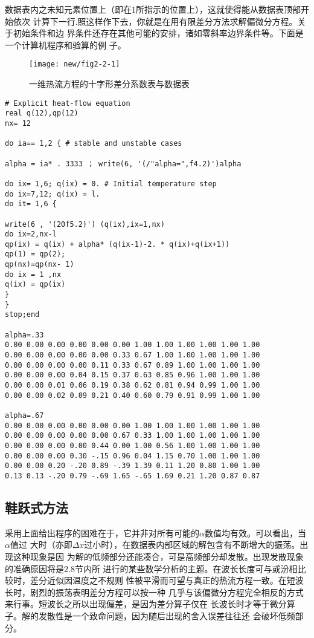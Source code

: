 数据表内之未知元素位置上（即在1所指示的位置上），这就使得能从数据表顶部开始依次
计算下一行.照这样作下去，你就是在用有限差分方法求解偏微分方程。关于初始条件和边
界条件还存在其他可能的安排，诸如零斜率边界条件等。下面是一个计算机程序和验算的例
子。
\begin{figure}[H]
\centering
\texttt{[image: new/fig2-2-1]}
\caption[fig2-2-1]{一维热流方程的十字形差分系数表与数据表}
\label{fig:new/fig2-2-1}
\end{figure}
\begin{verbatim}
# Explicit heat-flow equation 
real q(12),qp(12) 
nx= 12

do ia== 1,2 { # stable and unstable cases

alpha = ia* . 3333 ； write(6, '(/"alpha=",f4.2)')alpha 

do ix= 1,6; q(ix) = 0. # Initial temperature step
do ix=7,12; q(ix) = l. 
do it= 1,6 {

write(6 , '(20f5.2)') (q(ix),ix=1,nx) 
do ix=2,nx-l
qp(ix) = q(ix) + alpha* (q(ix-1)-2. * q(ix)+q(ix+1)) 
qp(1) = qp(2);
qp(nx)=qp(nx- 1) 
do ix = 1 ,nx
q(ix) = qp(ix)
}
}
stop;end

alpha=.33
0.00 0.00 0.00 0.00 0.00 0.00 1.00 1.00 1.00 1.00 1.00 1.00 
0.00 0.00 0.00 0.00 0.00 0.33 0.67 1.00 1.00 1.00 1.00 1.00
0.00 0.00 0.00 0.00 0.11 0.33 0.67 0.89 1.00 1.00 1.00 1.00
0.00 0.00 0.00 0.04 0.15 0.37 0.63 0.85 0.96 1.00 1.00 1.00
0.00 0.00 0.01 0.06 0.19 0.38 0.62 0.81 0.94 0.99 1.00 1.00
0.00 0.00 0.02 0.09 0.21 0.40 0.60 0.79 0.91 0.99 1.00 1.00

alpha=.67
0.00 0.00 0.00 0.00 0.00 0.00 1.00 1.00 1.00 1.00 1.00 1.00 
0.00 0.00 0.00 0.00 0.00 0.67 0.33 1.00 1.00 1.00 1.00 1.00
0.00 0.00 0.00 0.00 0.44 0.00 1.00 0.56 1.00 1.00 1.00 1.00
0.00 0.00 0.00 0.30 -.15 0.96 0.04 1.15 0.70 1.00 1.00 1.00
0.00 0.00 0.20 -.20 0.89 -.39 1.39 0.11 1.20 0.80 1.00 1.00
0.13 0.13 -.20 0.79 -.69 1.65 -.65 1.69 0.21 1.20 0.87 0.87
\end{verbatim}
\subsection{鞋跃式方法}
采用上面给出程序的困难在于，它并非对所有可能的$\alpha$数值均有效。可以看出，当$\alpha$值过
大时（亦即$\Delta x$过小时），在数据表内部区域的解包含有不断增大的振荡。出现这种现象是因
为解的低频部分还能凑合，可是高频部分却发散。出现发散现象的准确原因将是2.8节内所
进行的某些数学分析的主题。在波长长度可与或汾相比较时，差分近似因温度之不规则
性被平滑而可望与真正的热流方程一致。在短波长时，剧烈的振荡表明差分方程可以按一种
几乎与该偏微分方程完全相反的方式来行事。短波长之所以出现偏差，是因为差分算子仅在
长波长时才等于微分算子。解的发散性是一个致命问题，因为随后出现的舍入误差往往还
会破坏低频部分。

